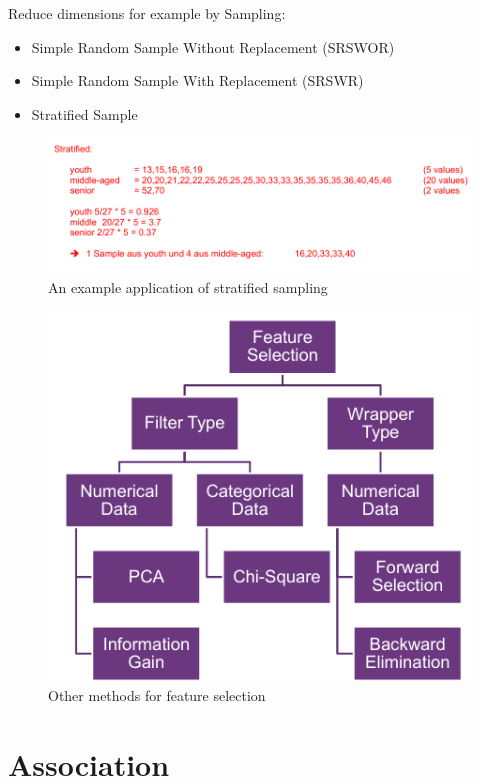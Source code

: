 \documentclass[../Main.tex]{subfiles}
\begin{document}
Reduce dimensions for example by Sampling:
\begin{itemize}
    \item Simple Random Sample Without Replacement (SRSWOR)
    \item Simple Random Sample With Replacement (SRSWR)
    \item Stratified Sample
\end{itemize}
\begin{figure}[H]
    \centering
    \includegraphics[width=0.75\linewidth]{Images/datan/stratified-example.png}
    \caption{An example application of stratified sampling}
\end{figure}
\begin{figure}[H]
    \centering
    \includegraphics[width=0.75\linewidth]{Images/datan/feature-selection.png}
    \caption{Other methods for feature selection}
\end{figure}

\section{Association}
\end{document}
